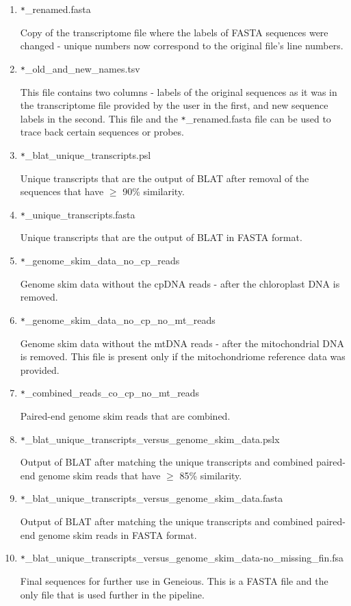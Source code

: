 \begin{enumerate}

\item \verb_*_\_renamed.fasta 

Copy of the transcriptome file where the labels of FASTA sequences were changed - unique numbers now correspond to the original file's line numbers. 

\item \verb_*_\_old\_and\_new\_names.tsv 

This file contains two columns - labels of the original sequences as it was in the transcriptome file provided by the user in the first, and new sequence labels in the 
second. This file and the \verb_*_\_renamed.fasta file can be used to trace back certain sequences or probes. 

\item \verb_*_\_blat\_unique\_transcripts.psl

Unique transcripts that are the output of BLAT after removal of the sequences that have $\geq$ 90\% similarity. 

\item \verb_*_\_unique\_transcripts.fasta

Unique transcripts that are the output of BLAT in FASTA format. 

\item \verb_*_\_genome\_skim\_data\_no\_cp\_reads

Genome skim data without the cpDNA reads - after the chloroplast DNA is removed. 

\item \verb_*_\_genome\_skim\_data\_no\_cp\_no\_mt\_reads

Genome skim data without the mtDNA reads - after the mitochondrial DNA is removed. This file is present only if the mitochondriome reference data was provided. 

\item \verb_*_\_combined\_reads\_co\_cp\_no\_mt\_reads

Paired-end genome skim reads that are combined. 

\item \verb_*_\_blat\_unique\_transcripts\_versus\_genome\_skim\_data.pslx

Output of BLAT after matching the unique transcripts and combined paired-end genome skim reads that have $\geq$ 85\% similarity. 

\item \verb_*_\_blat\_unique\_transcripts\_versus\_genome\_skim\_data.fasta

Output of BLAT after matching the unique transcripts and combined paired-end genome skim reads in FASTA format. 

\item \verb_*_\_blat\_unique\_transcripts\_versus\_genome\_skim\_data-no\_missing\_fin.fsa

Final sequences for further use in Geneious. This is a FASTA file and the only file that is used further in the pipeline. 


\end{enumerate}

